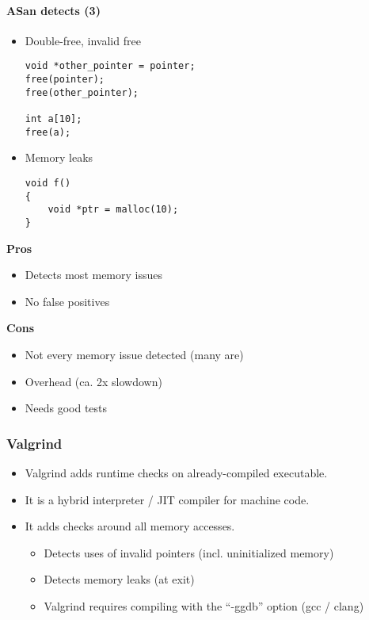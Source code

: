 \documentclass[12pt]{article}
\begin{document}
\paragraph{ASan detects (3)}

\begin{itemize}
    \item Double-free, invalid free
    
    \begin{verbatim}
void *other_pointer = pointer;
free(pointer);
free(other_pointer);

int a[10];
free(a);
    \end{verbatim}
    
    \item Memory leaks
    
    \begin{verbatim}
void f()
{
    void *ptr = malloc(10);
}
    \end{verbatim}
    
\end{itemize}

\textbf{Pros}
\begin{itemize}
    \item Detects most memory issues
    \item No false positives
\end{itemize}

\textbf{Cons}
\begin{itemize}
    \item Not every memory issue detected (many are)
    \item Overhead (ca. 2x slowdown)
    \item Needs good tests
\end{itemize}

\subsubsection{Valgrind}

\begin{itemize}
    \item Valgrind adds runtime checks on already-compiled executable.
    
    \item It is a hybrid interpreter / JIT compiler for machine code.
    
    \item It adds checks around all memory accesses.
    \begin{itemize}
        \item Detects uses of invalid pointers (incl. uninitialized memory)
        \item Detects memory leaks (at exit)
    \item Valgrind requires compiling with the ``-ggdb'' option (gcc / clang)
    \end{itemize}
\end{itemize}
\end{document}
